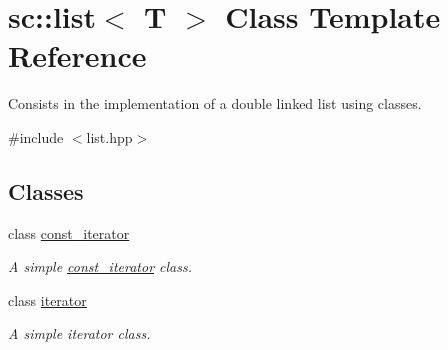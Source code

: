\hypertarget{classsc_1_1list}{}\section{sc\+:\+:list$<$ T $>$ Class Template Reference}
\label{classsc_1_1list}


Consists in the implementation of a double linked list using classes.  




{\ttfamily \#include $<$list.\+hpp$>$}

\subsection*{Classes}
\begin{DoxyCompactItemize}
\item 
class \mbox{\hyperlink{classsc_1_1list_1_1const__iterator}{const\+\_\+iterator}}
\begin{DoxyCompactList}\small\item\em A simple \mbox{\hyperlink{classsc_1_1list_1_1const__iterator}{const\+\_\+iterator}} class. \end{DoxyCompactList}\item 
class \mbox{\hyperlink{classsc_1_1list_1_1iterator}{iterator}}
\begin{DoxyCompactList}\small\item\em A simple iterator class. \end{DoxyCompactList}\end{DoxyCompactItemize}
